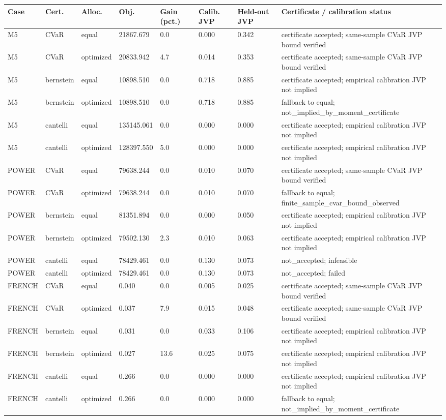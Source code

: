\begin{tabular}{llllllll}
\toprule
Case & Cert. & Alloc. & Obj. & Gain (pct.) & Calib. JVP & Held-out JVP & Certificate / calibration status \\
\midrule
M5 & CVaR & equal & 21867.679 & 0.0 & 0.000 & 0.342 & certificate accepted; same-sample CVaR JVP bound verified \\
M5 & CVaR & optimized & 20833.942 & 4.7 & 0.014 & 0.353 & certificate accepted; same-sample CVaR JVP bound verified \\
M5 & bernstein & equal & 10898.510 & 0.0 & 0.718 & 0.885 & certificate accepted; empirical calibration JVP not implied \\
M5 & bernstein & optimized & 10898.510 & 0.0 & 0.718 & 0.885 & fallback to equal; not\_implied\_by\_moment\_certificate \\
M5 & cantelli & equal & 135145.061 & 0.0 & 0.000 & 0.000 & certificate accepted; empirical calibration JVP not implied \\
M5 & cantelli & optimized & 128397.550 & 5.0 & 0.000 & 0.000 & certificate accepted; empirical calibration JVP not implied \\
POWER & CVaR & equal & 79638.244 & 0.0 & 0.010 & 0.070 & certificate accepted; same-sample CVaR JVP bound verified \\
POWER & CVaR & optimized & 79638.244 & 0.0 & 0.010 & 0.070 & fallback to equal; finite\_sample\_cvar\_bound\_observed \\
POWER & bernstein & equal & 81351.894 & 0.0 & 0.000 & 0.050 & certificate accepted; empirical calibration JVP not implied \\
POWER & bernstein & optimized & 79502.130 & 2.3 & 0.010 & 0.063 & certificate accepted; empirical calibration JVP not implied \\
POWER & cantelli & equal & 78429.461 & 0.0 & 0.130 & 0.073 & not\_accepted; infeasible \\
POWER & cantelli & optimized & 78429.461 & 0.0 & 0.130 & 0.073 & not\_accepted; failed \\
FRENCH & CVaR & equal & 0.040 & 0.0 & 0.005 & 0.025 & certificate accepted; same-sample CVaR JVP bound verified \\
FRENCH & CVaR & optimized & 0.037 & 7.9 & 0.015 & 0.048 & certificate accepted; same-sample CVaR JVP bound verified \\
FRENCH & bernstein & equal & 0.031 & 0.0 & 0.033 & 0.106 & certificate accepted; empirical calibration JVP not implied \\
FRENCH & bernstein & optimized & 0.027 & 13.6 & 0.025 & 0.075 & certificate accepted; empirical calibration JVP not implied \\
FRENCH & cantelli & equal & 0.266 & 0.0 & 0.000 & 0.000 & certificate accepted; empirical calibration JVP not implied \\
FRENCH & cantelli & optimized & 0.266 & 0.0 & 0.000 & 0.000 & fallback to equal; not\_implied\_by\_moment\_certificate \\
\bottomrule
\end{tabular}
